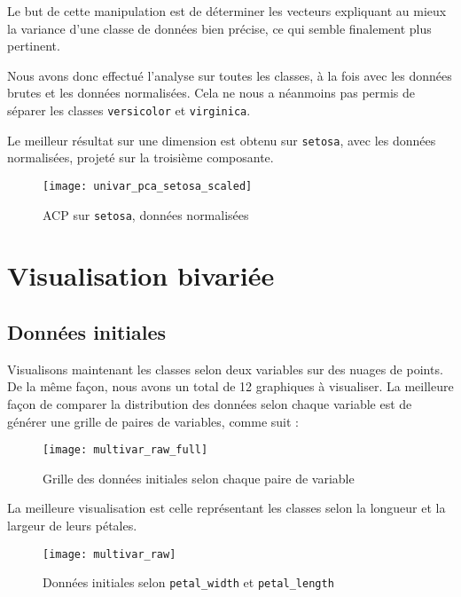 \documentclass[french]{report}
\begin{document}
    Le but de cette manipulation est de déterminer les vecteurs expliquant au mieux la variance d'une classe de données bien précise, ce qui semble finalement plus pertinent.
    
    Nous avons donc effectué l'analyse sur toutes les classes, à la fois avec les données brutes et les données normalisées.
    Cela ne nous a néanmoins pas permis de séparer les classes \texttt{versicolor} et \texttt{virginica}.
    
    Le meilleur résultat sur une dimension est obtenu sur \texttt{setosa}, avec les données normalisées, projeté sur la troisième composante.
    
    \begin{figure}[h]
        \centering
        \texttt{[image: univar\_pca\_setosa\_scaled]}
        \caption{ACP sur \texttt{setosa}, données normalisées}
    \end{figure}
    
    
    \chapter{Visualisation bivariée}
    
    \section{Données initiales}
    
    Visualisons maintenant les classes selon deux variables sur des nuages de points.
    De la même façon, nous avons un total de 12 graphiques à visualiser.
    La meilleure façon de comparer la distribution des données selon chaque variable est de générer une grille de paires de variables, comme suit :
    
    \begin{figure}[h]
        \centering
        \texttt{[image: multivar\_raw\_full]}
        \caption{Grille des données initiales selon chaque paire de variable}
    \end{figure}
    
    La meilleure visualisation est celle représentant les classes selon la longueur et la largeur de leurs pétales.
    
    \begin{figure}[h]
        \centering
        \texttt{[image: multivar\_raw]}
        \caption{Données initiales selon \texttt{petal\_width} et \texttt{petal\_length}}
    \end{figure}
    
\end{document}
